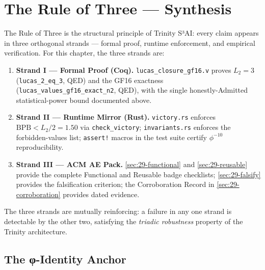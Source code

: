 \section{The Rule of Three — Synthesis}
\label{sec:29-rot}

The Rule of Three is the structural principle of Trinity S³AI:
every claim appears in three orthogonal strands — formal proof,
runtime enforcement, and empirical verification.  For this chapter,
the three strands are:

\begin{enumerate}
  \item \textbf{Strand I — Formal Proof (Coq).}
        \texttt{lucas\_closure\_gf16.v} proves $L_2 = 3$
        (\texttt{lucas\_2\_eq\_3}, QED) and the GF16 exactness
        (\texttt{lucas\_values\_gf16\_exact\_n2}, QED), with the single
        honestly-Admitted statistical-power bound documented above.
  \item \textbf{Strand II — Runtime Mirror (Rust).}
        \texttt{victory.rs} enforces $\mathrm{BPB} < L_2 / 2 = 1.50$
        via \texttt{check\_victory}; \texttt{invariants.rs} enforces
        the forbidden-values list; \texttt{assert!} macros in the test
        suite certify $\phi^{-10}$ reproducibility.
  \item \textbf{Strand III — ACM AE Pack.}
        \textsection\ref{sec:29-functional} and
        \textsection\ref{sec:29-reusable} provide the complete
        Functional and Reusable badge checklists;
        \textsection\ref{sec:29-falsify} provides the falsification
        criterion; the Corroboration Record in
        \textsection\ref{sec:29-corroboration} provides dated evidence.
\end{enumerate}

The three strands are mutually reinforcing: a failure in any one
strand is detectable by the other two, satisfying the
\emph{triadic robustness} property of the Trinity architecture.

\subsection{The φ-Identity Anchor}

